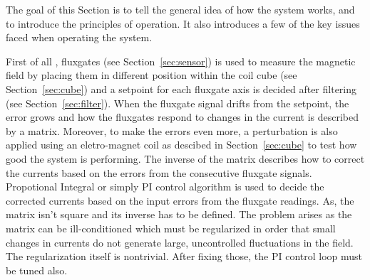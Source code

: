 
The goal of this Section is to tell the general idea of how the system works, and to introduce the principles of operation.  It also introduces a few of the key issues faced when operating the system. 

First of all , fluxgates (see Section~\ref{sec:sensor}) is used to measure the magnetic field by placing them in different position within the coil cube (see Section~\ref{sec:cube}) and a setpoint for each fluxgate axis is decided after filtering (see Section~\ref{sec:filter}). When the fluxgate signal drifts from the setpoint, the error grows and how the fluxgates respond to changes in the current is described by a matrix. Moreover, to make the errors even more, a perturbation is also applied using an eletro-magnet coil as descibed in Section~\ref{sec:cube} to test how good the system is performing. The inverse of the matrix describes how to correct the currents based on the errors from the consecutive fluxgate signals. Propotional Integral or simply PI control algorithm  is used to decide the corrected currents based on the input errors from the fluxgate readings. As, the matrix isn't square and its inverse has to be defined. The problem arises as the matrix can be ill-conditioned which must be regularized in order that small changes in currents do not generate large, uncontrolled fluctuations in the field.  The regularization itself is nontrivial. After fixing those, the PI control loop must be tuned also.


